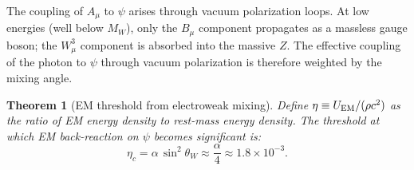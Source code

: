 \documentclass[11pt]{article}
\newtheorem{theorem}{Theorem}[section]
\begin{document}
The coupling of $A_\mu$ to $\psi$ arises through vacuum polarization loops.
At low energies (well below $M_W$), only the $B_\mu$ component propagates as a
massless gauge boson; the $W^3_\mu$ component is absorbed into the massive $Z$.
The effective coupling of the photon to $\psi$ through vacuum polarization is
therefore weighted by the mixing angle.

\begin{theorem}[EM threshold from electroweak mixing]
\label{thm:eta-threshold}
Define $\eta \equiv U_{\rm EM}/(\rho c^2)$ as the ratio of EM energy density
to rest-mass energy density.  The threshold at which EM back-reaction on $\psi$
becomes significant is:
\begin{equation}
\boxed{
\eta_c = \alpha\,\sin^2\theta_W \approx \frac{\alpha}{4} \approx 1.8\times 10^{-3}.
}
\label{eq:eta-threshold}
\end{equation}
\end{theorem}
\end{document}

